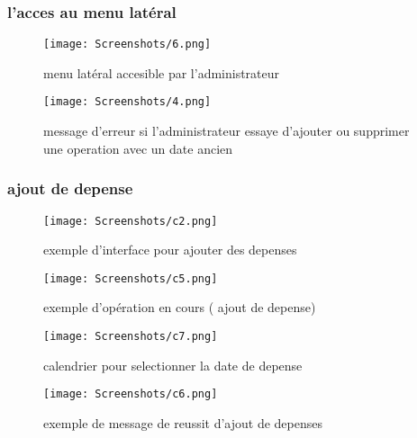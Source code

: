 \subsubsection{l'acces au menu latéral}
\begin{figure}[!htbp]
  \begin{minipage}[t]{0.4\textwidth}    %
          \texttt{[image: Screenshots/6.png]}
          \caption{ menu latéral accesible par l'administrateur}
  \end{minipage}%
  \begin{minipage}{0.20\textwidth}
    \hfill
  \end{minipage}
\begin{minipage}[t]{0.4\textwidth}
        \texttt{[image: Screenshots/4.png]}
        \caption{ message d'erreur si l'administrateur essaye d'ajouter ou supprimer une operation avec un date ancien}
\end{minipage}%
  \end{figure}
  \subsubsection{ajout de depense}
  \begin{figure}[!htbp]
    \begin{minipage}[t]{0.4\textwidth}    %
            \texttt{[image: Screenshots/c2.png]}
            \caption{ exemple d'interface pour ajouter des depenses}
    \end{minipage}%
    \begin{minipage}{0.20\textwidth}
      \hfill
    \end{minipage}
  \begin{minipage}[t]{0.4\textwidth}
          \texttt{[image: Screenshots/c5.png]}
          \caption{ exemple d'opération en cours ( ajout de depense) }
  \end{minipage}%
    \end{figure}
    \begin{figure}[!htbp]
      \begin{minipage}[t]{0.4\textwidth}    %
        \texttt{[image: Screenshots/c7.png]}
        \caption{ calendrier pour selectionner la date de depense}
          \end{minipage}%
          \begin{minipage}{0.20\textwidth}
            \hfill
          \end{minipage}
      \begin{minipage}[t]{0.4\textwidth}    %
              \texttt{[image: Screenshots/c6.png]}
              \caption{ exemple de message de reussit d'ajout de depenses}
      \end{minipage}%
      \end{figure}

